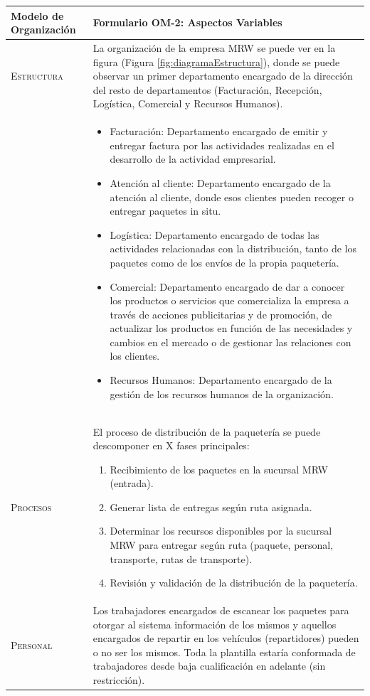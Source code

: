 \begin{table}[H]
  \scriptsize
  \begin{tabularx}{\textwidth}{|l|X|} 
    \hline
    \textbf{Modelo de Organización} & \textbf{Formulario OM-2: Aspectos Variables} \\ 
    \hline
    \hline
    \textsc{Estructura} & La organización de la empresa MRW se puede ver en la figura (Figura \ref{fig:diagramaEstructura}), donde se puede observar un primer departamento encargado de la dirección del resto de departamentos (Facturación, Recepción, Logística, Comercial y Recursos Humanos). \\ &
    \begin{itemize}
      \item Facturación: Departamento encargado de emitir y entregar factura por las actividades realizadas en el desarrollo de la actividad empresarial.
      \item Atención al cliente: Departamento encargado de la atención al cliente, donde esos clientes pueden recoger o entregar paquetes in situ.
      \item Logística: Departamento encargado de todas las actividades relacionadas con la distribución, tanto de los paquetes como de los envíos de la propia paquetería.
      \item Comercial: Departamento encargado de dar a conocer los productos o servicios que comercializa la empresa a través de acciones publicitarias y de promoción, de actualizar los productos en función de las necesidades y cambios en el mercado o de gestionar las relaciones con los clientes.
      \item Recursos Humanos: Departamento encargado de la gestión de los recursos humanos de la organización.
    \end{itemize} \\ 
    \hline
    \textsc{Procesos} & El proceso de distribución de la paquetería se puede descomponer en X fases principales: 
    \begin{enumerate}
      \item Recibimiento de los paquetes en la sucursal MRW (entrada).
      \item Generar lista de entregas según ruta asignada.
      \item Determinar los recursos disponibles por la sucursal MRW para entregar según ruta (paquete, personal, transporte, rutas de transporte).
      \item Revisión y validación de la distribución de la paquetería.
    \end{enumerate} \\ 
    \hline
    \textsc{Personal} &  Los trabajadores encargados de escanear los paquetes para otorgar al sistema información de los mismos y aquellos encargados de repartir en los vehículos (repartidores) pueden o no ser los mismos. Toda la plantilla estaría conformada de trabajadores desde baja cualificación en adelante (sin restricción).


\end{tabularx}
\end{table}
